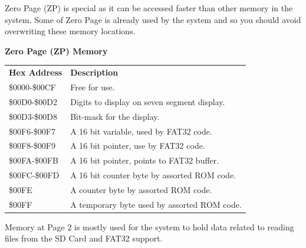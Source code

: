 \documentclass{ol-softwaremanual}
\begin{document}
Zero Page (ZP) is special as it can be accessed faster than other memory in the system. Some of Zero Page is already used by the system and so you should avoid overwriting these memory locations.\\
\begin{table}[H]
\centering
\textbf{Zero Page (ZP) Memory}\\
\begin{tabular}{|l|l|}
\cline{1-2}
\textbf{Hex Address} & \textbf{Description}  \\ \cline{1-2}
\$0000-\$00CF & Free for use.\\ \cline{1-2}
\$00D0-\$00D2 & Digits to display on seven segment display.\\ \cline{1-2}
\$00D3-\$00D8 & Bit-mask for the display.\\ \cline{1-2}
\$00F6-\$00F7 & A 16 bit variable, used by FAT32 code.\\ \cline{1-2}
\$00F8-\$00F9 & A 16 bit pointer, use by FAT32 code.\\ \cline{1-2}
\$00FA-\$00FB & A 16 bit pointer, points to FAT32 buffer.\\ \cline{1-2}
\$00FC-\$00FD & A 16 bit counter byte by assorted ROM code.\\ \cline{1-2}
\$00FE & A counter byte by assorted ROM code.\\ \cline{1-2}
\$00FF & A temporary byte used by assorted ROM code.\\ \cline{1-2}
\end{tabular}
\end{table}

\pagebreak
Memory at Page 2 is mostly used for the system to hold data related to reading files from the SD Card and FAT32 support.\\
\end{document}
